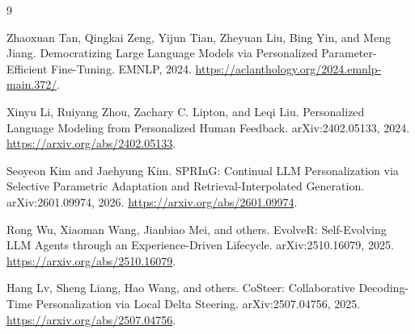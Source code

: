 \documentclass[11pt,UTF8,fontset=fandol]{ctexart}
\begin{document}
\begin{thebibliography}{9}

Zhaoxuan Tan, Qingkai Zeng, Yijun Tian, Zheyuan Liu, Bing Yin, and Meng Jiang.
\newblock Democratizing Large Language Models via Personalized
Parameter-Efficient Fine-Tuning.
\newblock EMNLP, 2024.
\newblock \url{https://aclanthology.org/2024.emnlp-main.372/}.

Xinyu Li, Ruiyang Zhou, Zachary C. Lipton, and Leqi Liu.
\newblock Personalized Language Modeling from Personalized Human Feedback.
\newblock arXiv:2402.05133, 2024.
\newblock \url{https://arxiv.org/abs/2402.05133}.

Seoyeon Kim and Jaehyung Kim.
\newblock SPRInG: Continual LLM Personalization via Selective Parametric
Adaptation and Retrieval-Interpolated Generation.
\newblock arXiv:2601.09974, 2026.
\newblock \url{https://arxiv.org/abs/2601.09974}.

Rong Wu, Xiaoman Wang, Jianbiao Mei, and others.
\newblock EvolveR: Self-Evolving LLM Agents through an Experience-Driven
Lifecycle.
\newblock arXiv:2510.16079, 2025.
\newblock \url{https://arxiv.org/abs/2510.16079}.

Hang Lv, Sheng Liang, Hao Wang, and others.
\newblock CoSteer: Collaborative Decoding-Time Personalization via Local
Delta Steering.
\newblock arXiv:2507.04756, 2025.
\newblock \url{https://arxiv.org/abs/2507.04756}.

\end{thebibliography}
\end{document}
